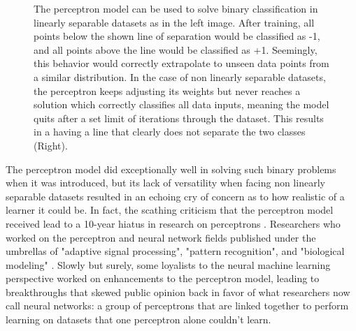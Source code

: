 \begin{figure}[!h]
\begin{subfigure}{0.49\textwidth}
  \end{subfigure}
  \caption{The perceptron model can be used to solve binary classification in linearly separable datasets as in the left image. After training, all points below the shown line of separation would be classified as -1, and all points above the line would be classified as +1. Seemingly, this behavior would correctly extrapolate to unseen data points from a similar distribution. In the case of non linearly separable datasets, the perceptron keeps adjusting its weights but never reaches a solution which correctly classifies all data inputs, meaning the model quits after a set limit of iterations through the dataset. This results in a having a line that clearly does not separate the two classes (Right).}
  \label{fig:perceptron_solution}
\end{figure}

The perceptron model did exceptionally well in solving such binary problems when it was introduced, but its lack of versatility when facing non linearly separable datasets resulted in an echoing cry of concern as to how realistic of a learner it could be. In fact, the scathing criticism that the perceptron model received lead to a 10-year hiatus in research on perceptrons \cite{minsky1969perceptrons}. Researchers who worked on the perceptron and neural network fields published under the umbrellas of  "adaptive signal processing", "pattern recognition", and "biological modeling" \cite{Yadav2015}. Slowly but surely, some loyalists to the neural machine learning perspective worked on enhancements to the perceptron model, leading to breakthroughs that skewed public opinion back in favor of what researchers now call neural networks: a group of perceptrons that are linked together to perform learning on datasets that one perceptron alone couldn't learn. 

